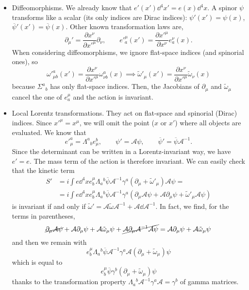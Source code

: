 \documentclass[a4paper,12pt]{book}
\begin{document}
\begin{itemize}
\item Diffeomorphisms. We already know that $e'(x')\dd^4x'=e(x)\dd^4x$. A spinor $\psi$ transforms like a scalar (its only indices are Dirac indices): $\psi'(x')=\psi(x)$, $\overline\psi'(x')=\overline\psi(x)$. Other known transformation laws are,
\[\partial_\mu'=\frac{\partial x^\nu}{\partial x'^\mu}\partial_\nu,\qquad e'^\mu_a(x')=\frac{\partial x'^\mu}{\partial x^\nu}e^\nu_a(x).\]
When considering diffeomorphisms, we ignore flat-space indices (and spinorial ones), so
\[\omega'^a_{\mu b}(x')=\frac{\partial x^\nu}{\partial x'^\mu}\omega^a_{\nu b}(x)\implies\tilde\omega'_\mu(x')=\frac{\partial x^\nu}{\partial x'^\mu}\tilde\omega_\nu(x)\]
because $\Sigma^a{}_b$ has only flat-space indices.
Then, the Jacobians of $\partial_\mu$ and $\tilde\omega_\mu$ cancel the one of $e^\mu_a$ and the action is invariant.
\item Local Lorentz transformations. They act on flat-space and spinorial (Dirac) indices. Since $x'^\mu=x^\mu$, we will omit the point ($x$ or $x'$) where all objects are evaluated. We know that
\[e'^a_\mu=\Lambda^a{}_be^b_\mu,\qquad \psi'=\mathcal A\psi,\qquad\overline\psi'=\overline\psi\mathcal A^{-1}.\]
Since the determinant can be written in a Lorentz-invariant way, we have $e'=e$. The mass term of the action is therefore invariant. We can easily check that the kinetic term
\begin{align*}
S'&=i\int e\dd^4xe^\mu_b\Lambda_a{}^b\overline\psi\mathcal A^{-1}\gamma^a(\partial_\mu+\tilde\omega'_\mu)\mathcal A\psi=\\
&=i\int e\dd^4xe^\mu_b\Lambda_a{}^b\overline\psi\mathcal A^{-1}\gamma^a(\partial_\mu\mathcal A\psi+\mathcal A\partial_\mu\psi+\tilde\omega'_\mu\mathcal A\psi)
\end{align*}
is invariant if and only if $\tilde\omega'=\mathcal A\tilde\omega\mathcal A^{-1}+\mathcal A\dd \mathcal A^{-1}$. In fact, we find, for the terms in parentheses,
\[\cancel{\partial_\mu\mathcal A\psi}+\mathcal A\partial_\mu\psi+\mathcal A\tilde\omega_\mu\psi+\cancel{\mathcal A\partial_\mu\mathcal A^{-1}\mathcal A\psi}=\mathcal A\partial_\mu\psi+\mathcal A\tilde\omega_\mu\psi\]
and then we remain with
\[e^\mu_b\Lambda_a{}^b\overline\psi\mathcal A^{-1}\gamma^a\mathcal A(\partial_\mu+\tilde\omega_\mu)\psi\]
which is equal to
\[e^\mu_b\overline\psi\gamma^b(\partial_\mu+\tilde\omega_\mu)\psi\]
thanks to the transformation property $\Lambda_a{}^b\mathcal A^{-1}\gamma^a\mathcal A=\gamma^b$ of gamma matrices.


\end{itemize}
\end{document}

